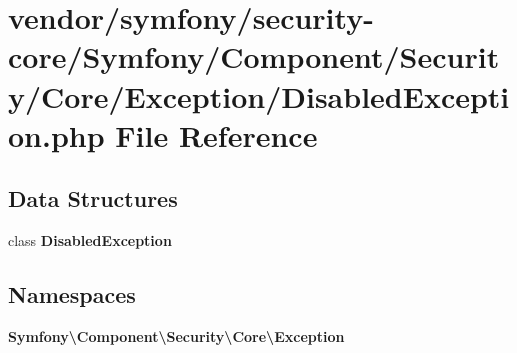\section{vendor/symfony/security-\/core/\+Symfony/\+Component/\+Security/\+Core/\+Exception/\+Disabled\+Exception.php File Reference}
\label{_disabled_exception_8php}
\subsection*{Data Structures}
\begin{DoxyCompactItemize}
\item 
class {\bf Disabled\+Exception}
\end{DoxyCompactItemize}
\subsection*{Namespaces}
\begin{DoxyCompactItemize}
\item 
 {\bf Symfony\textbackslash{}\+Component\textbackslash{}\+Security\textbackslash{}\+Core\textbackslash{}\+Exception}
\end{DoxyCompactItemize}
